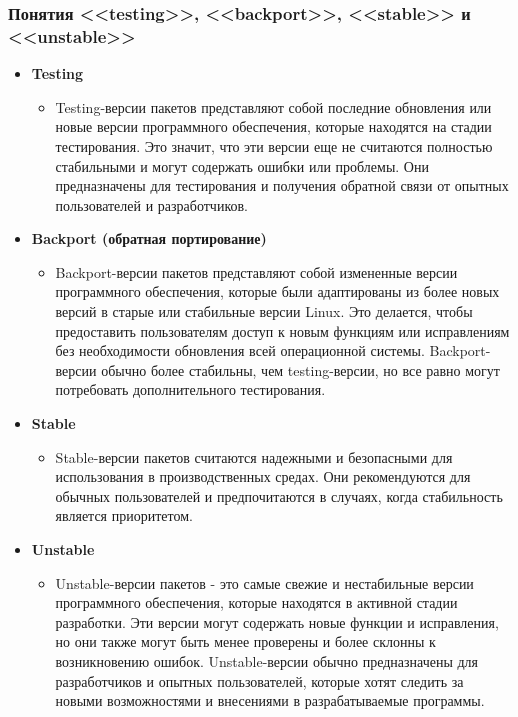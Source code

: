 \documentclass[oneside, final, 14pt]{extreport} %
\begin{document}
\subsubsection{Понятия <<testing>>, <<backport>>, <<stable>> и <<unstable>>}

\begin{itemize}

    \item \textbf{Testing}
            \begin{itemize}
            \item Testing-версии пакетов представляют собой последние обновления или новые версии программного обеспечения, которые находятся на стадии тестирования. Это значит, что эти версии еще не считаются полностью стабильными и могут содержать ошибки или проблемы. Они предназначены для тестирования и получения обратной связи от опытных пользователей и разработчиков.
            \end{itemize}
    \item \textbf{Backport (обратная портирование)}
            \begin{itemize}
                \item Backport-версии пакетов представляют собой измененные версии программного обеспечения, которые были адаптированы из более новых версий в старые или стабильные версии Linux. Это делается, чтобы предоставить пользователям доступ к новым функциям или исправлениям без необходимости обновления всей операционной системы. Backport-версии обычно более стабильны, чем testing-версии, но все равно могут потребовать дополнительного тестирования.
            \end{itemize}
    \item \textbf{Stable}
            \begin{itemize}
                \item Stable-версии пакетов считаются надежными и безопасными для использования в производственных средах. Они рекомендуются для обычных пользователей и предпочитаются в случаях, когда стабильность является приоритетом.
            \end{itemize}
    \item \textbf{Unstable}
            \begin{itemize}
                \item Unstable-версии пакетов - это самые свежие и нестабильные версии программного обеспечения, которые находятся в активной стадии разработки. Эти версии могут содержать новые функции и исправления, но они также могут быть менее проверены и более склонны к возникновению ошибок. Unstable-версии обычно предназначены для разработчиков и опытных пользователей, которые хотят следить за новыми возможностями и внесениями в разрабатываемые программы.
            \end{itemize}
\end{itemize}
\end{document}
